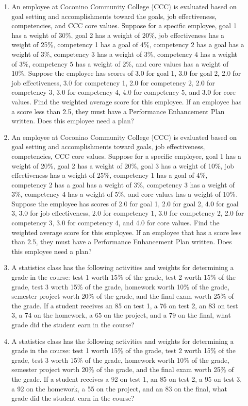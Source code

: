 \documentclass[]{book}
\begin{document}
\begin{enumerate}
\def\labelenumi{\arabic{enumi}.}
\setcounter{enumi}{6}
\item
  An employee at Coconino Community College (CCC) is evaluated based on goal setting and accomplishments toward the goals, job effectiveness, competencies, and CCC core values. Suppose for a specific employee, goal 1 has a weight of 30\%, goal 2 has a weight of 20\%, job effectiveness has a weight of 25\%, competency 1 has a goal of 4\%, competency 2 has a goal has a weight of 3\%, competency 3 has a weight of 3\%, competency 4 has a weight of 3\%, competency 5 has a weight of 2\%, and core values has a weight of 10\%. Suppose the employee has scores of 3.0 for goal 1, 3.0 for goal 2, 2.0 for job effectiveness, 3.0 for competency 1, 2.0 for competency 2, 2.0 for competency 3, 3.0 for competency 4, 4.0 for competency 5, and 3.0 for core values. Find the weighted average score for this employee. If an employee has a score less than 2.5, they must have a Performance Enhancement Plan written. Does this employee need a plan?
\item
  An employee at Coconino Community College (CCC) is evaluated based on goal setting and accomplishments toward goals, job effectiveness, competencies, CCC core values. Suppose for a specific employee, goal 1 has a weight of 20\%, goal 2 has a weight of 20\%, goal 3 has a weight of 10\%, job effectiveness has a weight of 25\%, competency 1 has a goal of 4\%, competency 2 has a goal has a weight of 3\%, competency 3 has a weight of 3\%, competency 4 has a weight of 5\%, and core values has a weight of 10\%. Suppose the employee has scores of 2.0 for goal 1, 2.0 for goal 2, 4.0 for goal 3, 3.0 for job effectiveness, 2.0 for competency 1, 3.0 for competency 2, 2.0 for competency 3, 3.0 for competency 4, and 4.0 for core values. Find the weighted average score for this employee. If an employee that has a score less than 2.5, they must have a Performance Enhancement Plan written. Does this employee need a plan?
\item
  A statistics class has the following activities and weights for determining a grade in the course: test 1 worth 15\% of the grade, test 2 worth 15\% of the grade, test 3 worth 15\% of the grade, homework worth 10\% of the grade, semester project worth 20\% of the grade, and the final exam worth 25\% of the grade. If a student receives an 85 on test 1, a 76 on test 2, an 83 on test 3, a 74 on the homework, a 65 on the project, and a 79 on the final, what grade did the student earn in the course?
\item
  A statistics class has the following activities and weights for determining a grade in the course: test 1 worth 15\% of the grade, test 2 worth 15\% of the grade, test 3 worth 15\% of the grade, homework worth 10\% of the grade, semester project worth 20\% of the grade, and the final exam worth 25\% of the grade. If a student receives a 92 on test 1, an 85 on test 2, a 95 on test 3, a 92 on the homework, a 55 on the project, and an 83 on the final, what grade did the student earn in the course?
\end{enumerate}
\end{document}
